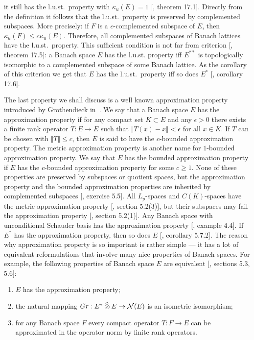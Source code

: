 it still has the l.u.st.\ property with $\kappa_u(E)=1$
[\cite{DiestAbsSumOps}, theorem 17.1]. Directly from the definition it follows
that the l.u.st.\ property is preserved by complemented subspaces. More
precisely: if $F$ is a $c$-complemented subspace of $E$, 
then $\kappa_u(F)\leq c\kappa_u(E)$. 
Therefore, all complemented subspaces of Banach lattices have the
l.u.st.\ property. This sufficient condition is not far from criterion
[\cite{DiestAbsSumOps}, theorem 17.5]: a Banach space $E$ has the l.u.st.
property iff $E^{**}$ is topologically isomorphic to a complemented subspace of
some Banach lattice. As the corollary of this criterion we get that $E$ has the
l.u.st.\ property iff so does $E^*$ [\cite{DiestAbsSumOps}, corollary 17.6].

The last property we shall discuss is a well known approximation property
introduced by Grothendieck in~\cite{GrothProdTenTopNucl}. We say that a Banach
space $E$ has the approximation property if for any compact set $K\subset E$ and
any $\epsilon>0$ there exists a finite rank operator $T:E\to E$ such 
that $\Vert T(x)-x\Vert<\epsilon$ for all $x\in K$. If $T$ can be 
chosen with $\Vert T\Vert\leq c$, then $E$ is said to have the $c$-bounded
approximation property. The metric approximation property is another name for
$1$-bounded approximation property. We say that $E$ has the bounded
approximation property if $E$ has the $c$-bounded approximation property for
some $c\geq 1$. None of these properties are preserved by subspaces or quotient
spaces, but the approximation property and the bounded approximation properties
are inherited by complemented subspaces [\cite{DefFloTensNorOpId}, exercise
5.5]. All $L_p$-spaces and $C(K)$-spaces have the metric approximation property
[\cite{DefFloTensNorOpId}, section 5.2(3)], but their subspaces may fail the
approximation property [\cite{DefFloTensNorOpId}, section 5.2(1)]. Any Banach
space with unconditional Schauder basis has the approximation property
[\cite{RyanIntroTensNormsBanSp}, example 4.4]. If $E^*$ has the approximation
property, then so does $E$ [\cite{DefFloTensNorOpId}, corollary 5.7.2]. The
reason why approximation property is so important is rather simple --- it has a
lot of equivalent reformulations that involve many nice properties of Banach
spaces. For example, the following properties of Banach space $E$ are equivalent
[\cite{DefFloTensNorOpId}, sections 5.3, 5.6]:
\begin{enumerate}[label = (\roman*)]
  \item $E$ has the approximation property;

  \item the natural mapping $Gr:E^*\mathbin{\widehat{\otimes}} E\to\mathcal{N}(E)$ is an isometric
  isomorphism;

  \item for any Banach space $F$ every compact operator $T:F\to E$ can be
  approximated in the operator norm by finite rank operators.
\end{enumerate}

